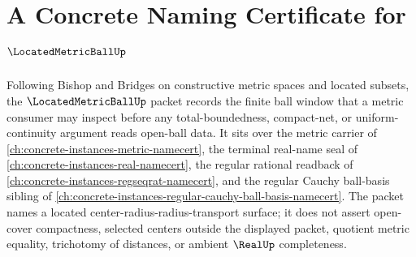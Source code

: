 \chapter{A Concrete Naming Certificate for $\LocatedMetricBallUp$}
\label{ch:concrete-instances-located-metric-ball-namecert}

Following Bishop and Bridges on constructive metric spaces and located subsets, the $\LocatedMetricBallUp$ packet records the finite ball window that a metric consumer may inspect before any total-boundedness, compact-net, or uniform-continuity argument reads open-ball data. It sits over the metric carrier of \autoref{ch:concrete-instances-metric-namecert}, the terminal real-name seal of \autoref{ch:concrete-instances-real-namecert}, the regular rational readback of \autoref{ch:concrete-instances-regseqrat-namecert}, and the regular Cauchy ball-basis sibling of \autoref{ch:concrete-instances-regular-cauchy-ball-basis-namecert}. The packet names a located center-radius-radius-transport surface; it does not assert open-cover compactness, selected centers outside the displayed packet, quotient metric equality, trichotomy of distances, or ambient $\RealUp$ completeness.

